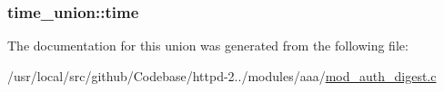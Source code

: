 \subsubsection[{\texorpdfstring{time}{time}}]{ time\+\_\+union\+::time}\hypertarget{uniontime__union_a9a5b1768f65ab2e0a646fe71066a5329}{}\label{uniontime__union_a9a5b1768f65ab2e0a646fe71066a5329}


The documentation for this union was generated from the following file\+:\begin{DoxyCompactItemize}
\item 
/usr/local/src/github/\+Codebase/httpd-\/2../modules/aaa/\hyperlink{mod__auth__digest_8c}{mod\+\_\+auth\+\_\+digest.\+c}\end{DoxyCompactItemize}
